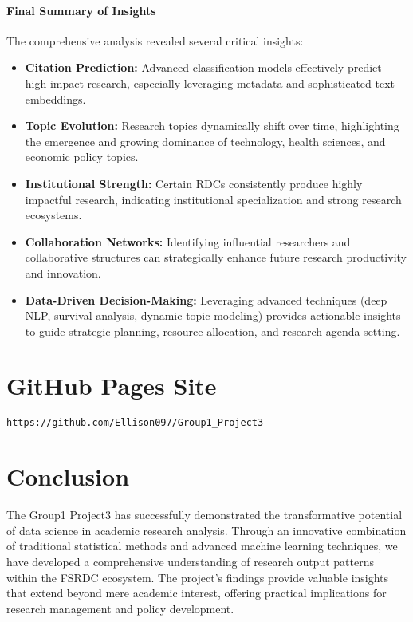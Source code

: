 \documentclass[12pt]{article}
\begin{document}
\paragraph{Final Summary of Insights}
The comprehensive analysis revealed several critical insights:
\begin{itemize}
  \item \textbf{Citation Prediction:} Advanced classification models effectively predict high-impact research, especially leveraging metadata and sophisticated text embeddings.
  \item \textbf{Topic Evolution:} Research topics dynamically shift over time, highlighting the emergence and growing dominance of technology, health sciences, and economic policy topics.
  \item \textbf{Institutional Strength:} Certain RDCs consistently produce highly impactful research, indicating institutional specialization and strong research ecosystems.
  \item \textbf{Collaboration Networks:} Identifying influential researchers and collaborative structures can strategically enhance future research productivity and innovation.
  \item \textbf{Data-Driven Decision-Making:} Leveraging advanced techniques (deep NLP, survival analysis, dynamic topic modeling) provides actionable insights to guide strategic planning, resource allocation, and research agenda-setting.
\end{itemize}

\section{GitHub Pages Site}
\href{https://github.com/Ellison097/Group1_Project3}{\texttt{https://github.com/Ellison097/Group1\_Project3}}

\section{Conclusion}
The Group1 Project3 has successfully demonstrated the transformative potential of data science in academic research analysis. Through an innovative combination of traditional statistical methods and advanced machine learning techniques, we have developed a comprehensive understanding of research output patterns within the FSRDC ecosystem. The project's findings provide valuable insights that extend beyond mere academic interest, offering practical implications for research management and policy development.
\end{document}
